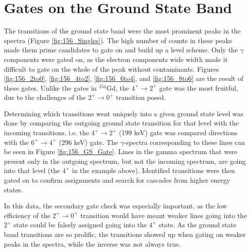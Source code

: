 \section{Gates on the Ground State Band}

The transitions of the ground state band were the most prominent peaks in the spectra (Figure \ref{fig:156_Singles}). The high number of counts in these peaks made them prime candidates to gate on and build up a level scheme. Only the $\gamma$ components were gated on, as the electron components wide width made it difficult to gate on the whole of the peak without contaminants. Figures \ref{fig:156_2to0}, \ref{fig:156_4to2}, \ref{fig:156_6to4}, and \ref{fig:156_8to6} are the result of these gates. Unlike the gates in $^{154}$Gd, the $4^+\rightarrow2^+$ gate was the most fruitful, due to the challenges of the $2^+\rightarrow0^+$ transition posed. 

\afterpage{\clearpage}

\afterpage{\clearpage}

\afterpage{\clearpage}

\afterpage{\clearpage}

Determining which transitions went uniquely into a given ground state level was done by comparing the outgoing ground state transition for that level with the incoming transitions, i.e. the $4^+\rightarrow2^+$ (199 keV) gate was compared directions with the $6^+\rightarrow4^+$ (296 keV) gate. The $\gamma$-spectra corresponding to these lines can be seen in Figure \ref{fig:156_GS_Gate}. Lines in the gamma spectrum that were present only in the outgoing spectrum, but not the incoming spectrum, are going into that level (the $4^+$ in the example above). Identified transitions were then gated on to confirm assignments and search for cascades from higher energy states.



In this data, the secondary gate check was especially important, as the low efficiency of the $2^+\rightarrow0^+$ transition would have meant weaker lines going into the $2^+$ state could be falsely assigned going into the $4^+$ state. As the ground state band transitions are so prolific, the transitions showed up when gating on weaker peaks in the spectra, while the inverse was not always true.

